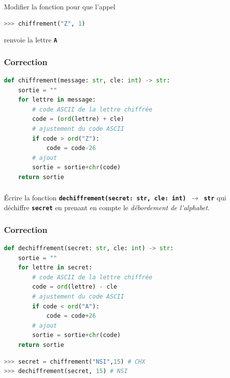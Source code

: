 \documentclass[svgnames,11pt]{beamer}
\begin{document}
\begin{frame}[fragile]
    \frametitle{}

    \begin{activite}
    Modifier la fonction pour que l'appel
\begin{center}
\begin{lstlisting}[language=Python , basicstyle=\ttfamily\small, xleftmargin=2em, xrightmargin=2em]
>>> chiffrement("Z", 1)
\end{lstlisting}
\end{center}
renvoie la lettre \textbf{\texttt{A}}
    \end{activite}

\end{frame}
\begin{frame}[fragile]
    \frametitle{Correction}

\begin{center}
\begin{lstlisting}[language=Python , basicstyle=\ttfamily\small, xleftmargin=0.2em, xrightmargin=0em]
def chiffrement(message: str, cle: int) -> str:
    sortie = ""
    for lettre in message:
        # code ASCII de la lettre chiffrée
        code = (ord(lettre) + cle)
        # ajustement du code ASCII
        if code > ord("Z"):
            code = code-26
        # ajout
        sortie = sortie+chr(code)
    return sortie
\end{lstlisting}
\end{center}

\end{frame}
\begin{frame}
    \frametitle{}

    \begin{activite}
    Écrire la fonction \textbf{\texttt{dechiffrement(secret: str, cle: int) $\rightarrow$ str}} qui déchiffre \textbf{\texttt{secret}} en prenant en compte le \emph{débordement de l'alphabet}.
    \end{activite}

\end{frame}
\begin{frame}[fragile]
    \frametitle{Correction}

\begin{center}
\begin{lstlisting}[language=Python , basicstyle=\ttfamily\small, xleftmargin=0.2em, xrightmargin=0em]
def dechiffrement(secret: str, cle: int) -> str:
    sortie = ""
    for lettre in secret:
        # code ASCII de la lettre chiffrée
        code = ord(lettre) - cle
        # ajustement du code ASCII
        if code < ord("A"):
            code = code+26
        # ajout
        sortie = sortie+chr(code)
    return sortie

\end{lstlisting}
\begin{lstlisting}[language=Python , basicstyle=\ttfamily\small, xleftmargin=0.2em, xrightmargin=0em]
>>> secret = chiffrement("NSI",15) # CHX
>>> dechiffrement(secret, 15) # NSI
\end{lstlisting}
\end{center}

\end{frame}
\end{document}
